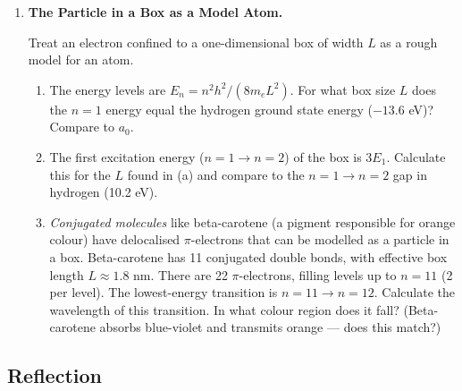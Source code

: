 \documentclass[12pt, a4paper]{book}
\begin{document}
\begin{deepbox}
\begin{enumerate}[label=\textbf{D\arabic*.}]
  \item \textbf{The Particle in a Box as a Model Atom.}

        Treat an electron confined to a one-dimensional box
        of width $L$ as a rough model for an atom.

        \begin{enumerate}[label=(\alph*)]
          \item The energy levels are $E_n = n^2 h^2/(8m_eL^2)$.
                For what box size $L$ does the $n=1$ energy
                equal the hydrogen ground state energy ($-13.6$ eV)?
                Compare to $a_0$.
          \item The first excitation energy ($n=1 \to n=2$)
                of the box is $3E_1$.
                Calculate this for the $L$ found in (a)
                and compare to the $n=1\to n=2$ gap in hydrogen
                (10.2 eV).
          \item \emph{Conjugated molecules} like beta-carotene
                (a pigment responsible for orange colour)
                have delocalised $\pi$-electrons that can
                be modelled as a particle in a box.
                Beta-carotene has 11 conjugated double bonds,
                with effective box length $L \approx 1.8$ nm.
                There are 22 $\pi$-electrons, filling levels
                up to $n=11$ (2 per level).
                The lowest-energy transition is $n=11\to n=12$.
                Calculate the wavelength of this transition.
                In what colour region does it fall?
                (Beta-carotene absorbs blue-violet and transmits
                orange --- does this match?)
        \end{enumerate}

\end{enumerate}
\end{deepbox}

\subsection*{Reflection}
\end{document}
